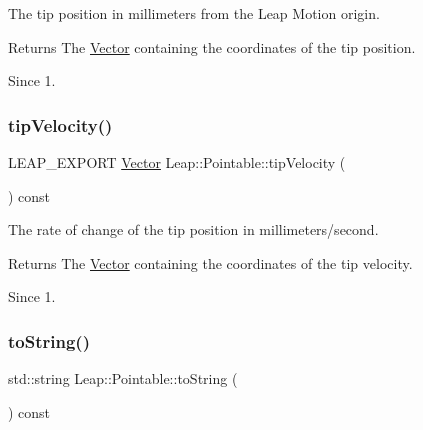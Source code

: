 The tip position in millimeters from the Leap Motion origin.


\begin{DoxyCodeInclude}
\end{DoxyCodeInclude}


\begin{DoxyReturn}{Returns}
The \hyperlink{struct_leap_1_1_vector}{Vector} containing the coordinates of the tip position. 
\end{DoxyReturn}
\begin{DoxySince}{Since}
1. 
\end{DoxySince}
\mbox{\label{class_leap_1_1_pointable_a20994b306714ee014523136e0c551b9e}} 
\subsubsection{\texorpdfstring{tip\+Velocity()}{tipVelocity()}}
{\footnotesize\ttfamily L\+E\+A\+P\+\_\+\+E\+X\+P\+O\+RT \hyperlink{struct_leap_1_1_vector}{Vector} Leap\+::\+Pointable\+::tip\+Velocity (\begin{DoxyParamCaption}{ }\end{DoxyParamCaption}) const}

The rate of change of the tip position in millimeters/second.


\begin{DoxyCodeInclude}
\end{DoxyCodeInclude}


\begin{DoxyReturn}{Returns}
The \hyperlink{struct_leap_1_1_vector}{Vector} containing the coordinates of the tip velocity. 
\end{DoxyReturn}
\begin{DoxySince}{Since}
1. 
\end{DoxySince}
\mbox{\label{class_leap_1_1_pointable_a846ad477711845f10853e7f3878a0c88}} 
\subsubsection{\texorpdfstring{to\+String()}{toString()}}
{\footnotesize\ttfamily std\+::string Leap\+::\+Pointable\+::to\+String (\begin{DoxyParamCaption}{ }\end{DoxyParamCaption}) const\hspace{0.3cm}{\ttfamily [inline]}}

